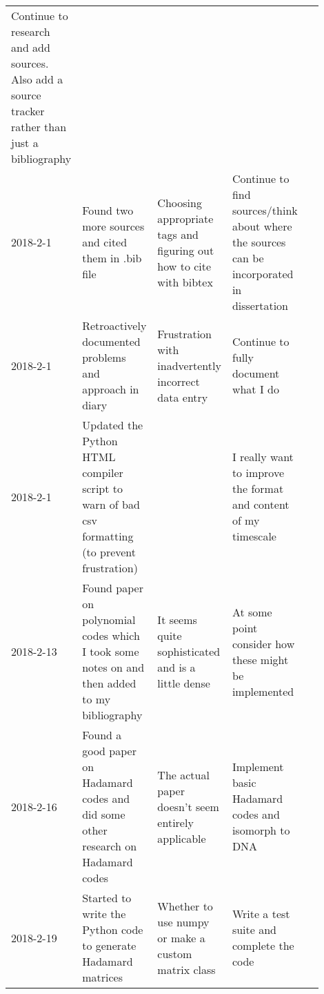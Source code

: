 \documentclass{article}
\begin{document}
\begin{center}
{\begin{longtable}{p{0.1\linewidth} p{0.2\linewidth} p{0.2\linewidth} p{0.2\linewidth} p{0.2\linewidth}}
    Continue to research and add sources. Also add a source tracker rather than
    just a bibliography &

    \\ 2018-2-1 &

    Found two more sources and cited them in .bib file &

    Choosing appropriate tags and figuring out how to cite with bibtex &

    Continue to find sources/think about where the sources can be incorporated
    in dissertation &

    \\ 2018-2-1 &

    Retroactively documented problems and approach in diary &

    Frustration with inadvertently incorrect data entry &

    Continue to fully document what I do &

    \\ 2018-2-1 &

    Updated the Python HTML compiler script to warn of bad csv formatting (to
    prevent frustration) &

    &

    I really want to improve the format and content of my timescale &

    \\ 2018-2-13 &

    Found paper on polynomial codes which I took some notes on and then added
    to my bibliography &

    It seems quite sophisticated and is a little dense &

    At some point consider how these might be implemented &

    \\ 2018-2-16 &

    Found a good paper on Hadamard codes and did some other research on
    Hadamard codes &

    The actual paper doesn't seem entirely applicable &

    Implement basic Hadamard codes and isomorph to DNA &

    \\ 2018-2-19 &

    Started to write the Python code to generate Hadamard matrices &

    Whether to use numpy or make a custom matrix class &

    Write a test suite and complete the code &


\end{longtable}}
\end{center}
\end{document}
